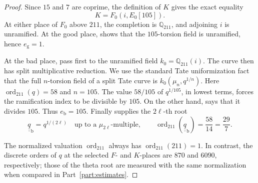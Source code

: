 \documentclass[11pt]{article}
\theoremstyle{plain}
\theoremstyle{definition}
\newcommand{\ord}{\operatorname{ord}}
\begin{document}
\begin{proof}
Since $15$ and $7$ are coprime, the definition of $K$ gives the exact equality
\[
 K=F_0(i,E_0[105]).
\]
At either place of $F_0$ above $211$, the completion is $\mathbb Q_{211}$,
and adjoining $i$ is unramified. At the good place,
\cite[Proposition 1.8(vii)]{IUT4} shows that the $105$-torsion field
is unramified, hence $e_{\mathrm g}=1$.

At the bad place, pass first to the unramified field
$k_0=\mathbb Q_{211}(i)$. The curve then has split multiplicative reduction.
We use the standard Tate uniformization fact that the full $n$-torsion field
of a split Tate curve is $k_0(\mu_n,q^{1/n})$.
Here $\ord_{211}(q)=58$ and $n=105$.
The value $58/105$ of $q^{1/105}$, in lowest terms, forces the ramification
index to be divisible by $105$.
On the other hand, \cite[Proposition 1.8(vii)]{IUT4} says that it divides
$105$. Thus $e_{\mathrm b}=105$.
Finally \cite[Example 3.2(iv)]{IUT1} supplies the $2\ell$-th root
\[
 \underline{\underline q}_{\mathrm b}=q^{1/(2\ell)}
 \quad\text{up to a }\mu_{2\ell}\text{-multiple},
 \qquad
 \ord_{211}(\underline{\underline q}_{\mathrm b})=\frac{58}{14}=\frac{29}{7}.
\]

The normalized valuation $\ord_{211}$ always has $\ord_{211}(211)=1$.
In contrast, the discrete orders of $q$ at the selected $F$- and $K$-places
are $870$ and $6090$, respectively; those of the theta root are measured
with the same normalization when compared in Part~\ref{part:estimates}.
\end{proof}
\end{document}
